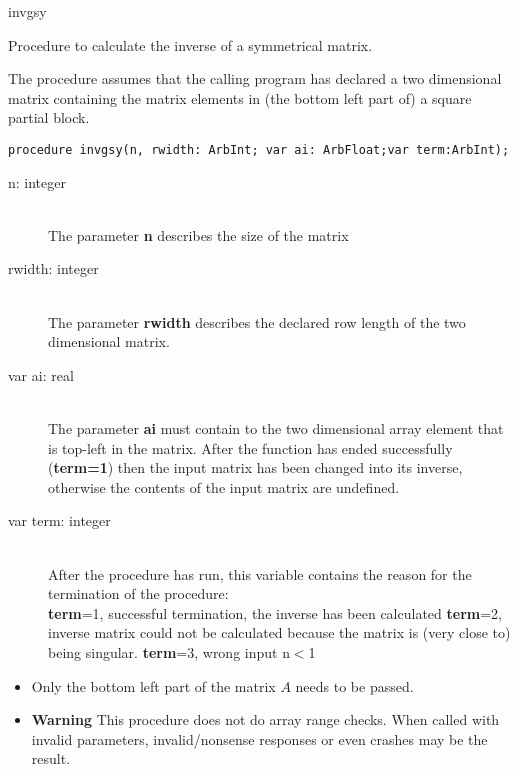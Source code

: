 \documentclass{report}
\newcommand{\FunctionDescription}{\item[Description]\rmfamily}
\newcommand{\Dataorganisation}{\item[Data Struct]\rmfamily}
\newcommand{\DeclarationandParams}{\item[Declaration]\rmfamily}
\newcommand{\Remarks}{\item[Remarks]\rmfamily}
\begin{document}
\begin{procedure}{invgsy}

\FunctionDescription

Procedure to calculate the inverse of a symmetrical matrix.

\Dataorganisation

The procedure assumes that the calling program has declared a two
dimensional matrix containing the matrix elements in (the bottom
left part of) a square partial block.

\DeclarationandParams

\lstinline|procedure invgsy(n, rwidth: ArbInt; var ai: ArbFloat;var term:ArbInt);|

\begin{description}
 \item[n: integer] \mbox{ } \\
    The parameter {\bf n} describes the size of the matrix
 \item[rwidth: integer] \mbox{} \\
    The parameter {\bf rwidth} describes the declared row length of the two dimensional
    matrix.
 \item[var ai: real] \mbox{} \\
    The parameter {\bf ai} must contain to the two dimensional array element
    that is top-left in the matrix.
    After the function has ended successfully (\textbf{term=1}) then
    the input matrix has been changed into its inverse, otherwise the contents
    of the input matrix are undefined.
 \item[var term: integer]  \mbox{} \\
    After the procedure has run, this variable contains the reason for
    the termination of the procedure:\\
      {\bf term}=1, successful termination, the inverse has been calculated
      {\bf term}=2, inverse matrix could not be calculated because the matrix
                    is (very close to) being singular.
      {\bf term}=3, wrong input n$<$1

\end{description}

\Remarks
\begin{itemize}
\item Only the bottom left part of the matrix $A$ needs to be passed.
\item \textbf{Warning} This procedure does not do array range checks. When called with invalid
parameters, invalid/nonsense responses or even crashes may be the result.
\end{itemize}


\end{procedure}
\end{document}
